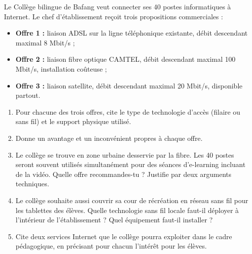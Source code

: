 \documentclass[11pt]{article}
\begin{document}
\begin{exercice}
Le Collège bilingue de Bafang veut connecter ses 40 postes informatiques à Internet. Le chef d'établissement reçoit trois propositions commerciales :
\begin{itemize}
    \item \textbf{Offre 1 :} liaison ADSL sur la ligne téléphonique existante, débit descendant maximal 8 Mbit/s ;
    \item \textbf{Offre 2 :} liaison fibre optique CAMTEL, débit descendant maximal 100 Mbit/s, installation coûteuse ;
    \item \textbf{Offre 3 :} liaison satellite, débit descendant maximal 20 Mbit/s, disponible partout.
\end{itemize}
\begin{enumerate}
    \item Pour chacune des trois offres, cite le type de technologie d'accès (filaire ou sans fil) et le support physique utilisé.
    \item Donne un avantage et un inconvénient propres à chaque offre.
    \item Le collège se trouve en zone urbaine desservie par la fibre. Les 40 postes seront souvent utilisés simultanément pour des séances d'e-learning incluant de la vidéo. Quelle offre recommandes-tu ? Justifie par deux arguments techniques.
    \item Le collège souhaite aussi couvrir sa cour de récréation en réseau sans fil pour les tablettes des élèves. Quelle technologie sans fil locale faut-il déployer à l'intérieur de l'établissement ? Quel équipement faut-il installer ?
    \item Cite deux services Internet que le collège pourra exploiter dans le cadre pédagogique, en précisant pour chacun l'intérêt pour les élèves.
\end{enumerate}
\end{exercice}
\end{document}
